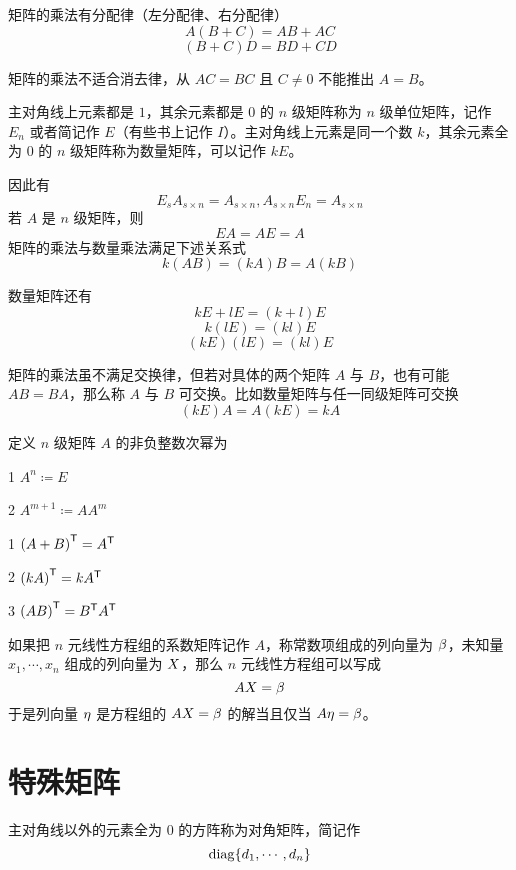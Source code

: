 \begin{theorem}
    矩阵的乘法有分配律（左分配律、右分配律）
    \[A(B+C) = AB+AC\]
    \[(B+C)D = BD + CD\]
\end{theorem}

矩阵的乘法不适合消去律，从 $AC = BC$ 且 $C\ne 0$ 不能推出 $A=B$。

主对角线上元素都是 $1$，其余元素都是 $0$ 的 $n$ 级矩阵称为 $n$ 级单位矩阵，记作 $E_n$ 或者简记作 $E$（有些书上记作 $I$）。主对角线上元素是同一个数 $k$，其余元素全为 $0$ 的 $n$ 级矩阵称为数量矩阵，可以记作 $kE$。

因此有
\[E_s A_{s\times n} = A_{s\times n}, A_{s\times n} E_n= A_{s\times n}\]
若 $A$ 是 $n$ 级矩阵，则
\[EA = AE = A\]
矩阵的乘法与数量乘法满足下述关系式
\[k(AB) = (kA)B = A(kB)\]

数量矩阵还有
\[kE + lE = (k+l)E\]
\[k(lE) = (kl)E\]
\[(kE)(lE) = (kl)E\]

矩阵的乘法虽不满足交换律，但若对具体的两个矩阵 $A$ 与 $B$，也有可能 $AB = BA$，那么称 $A$ 与 $B$ 可交换。比如数量矩阵与任一同级矩阵可交换
\[(kE)A = A(kE) = kA\]

\begin{definition}
    定义 $n$ 级矩阵 $A$ 的非负整数次幂为

    \num{1} $A^n \coloneqq  E$

    \num{2} $A^{m+1} \coloneqq  AA^m$
\end{definition}


\begin{theorem}
    \num{1} ${(A+B)}^\mathsf{T} = {A}^\mathsf{T}$
    
    \num{2} ${(kA)}^\mathsf{T} = k{A}^\mathsf{T}$
    
    \num{3} ${(AB)}^\mathsf{T} = {B}^\mathsf{T}{A}^\mathsf{T}$
\end{theorem}

如果把 $n$ 元线性方程组的系数矩阵记作 $A$，称常数项组成的列向量为 $\beta$，未知量 $x_1,\cdots,x_n$ 组成的列向量为 $X$，那么 $n$ 元线性方程组可以写成
\[AX = \beta\]
于是列向量 $\eta$ 是方程组的 $AX = \beta$ 的解当且仅当 $A\eta = \beta$。

\section{特殊矩阵}

\begin{definition}
    主对角线以外的元素全为 $0$ 的方阵称为对角矩阵，简记作
    \[\operatorname{diag}\{d_1,\cdots,d_n\}\]
\end{definition}

